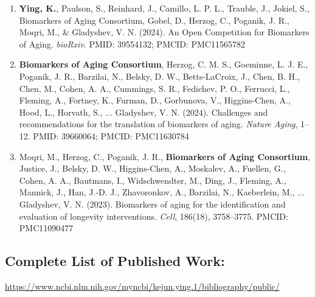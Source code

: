 \documentclass{nihbiosketch}
\begin{document}
\begin{enumerate}
\begin{enumerate}
\item \textbf{Ying, K.}, Paulson, S., Reinhard, J., Camillo, L. P. L., Trauble, J., Jokiel, S., Biomarkers of Aging Consortium, Gobel, D., Herzog, C., Poganik, J. R., Moqri, M., \& Gladyshev, V. N. (2024). An Open Competition for Biomarkers of Aging. \textit{bioRxiv}. PMID: 39554132; PMCID: PMC11565782

\item \textbf{Biomarkers of Aging Consortium}, Herzog, C. M. S., Goeminne, L. J. E., Poganik, J. R., Barzilai, N., Belsky, D. W., Betts-LaCroix, J., Chen, B. H., Chen, M., Cohen, A. A., Cummings, S. R., Fedichev, P. O., Ferrucci, L., Fleming, A., Fortney, K., Furman, D., Gorbunova, V., Higgins-Chen, A., Hood, L., Horvath, S., ... Gladyshev, V. N. (2024). Challenges and recommendations for the translation of biomarkers of aging. \textit{Nature Aging}, 1--12. PMID: 39660064; PMCID: PMC11630784

\item Moqri, M., Herzog, C., Poganik, J. R., \textbf{Biomarkers of Aging Consortium}, Justice, J., Belsky, D. W., Higgins-Chen, A., Moskalev, A., Fuellen, G., Cohen, A. A., Bautmans, I., Widschwendter, M., Ding, J., Fleming, A., Mannick, J., Han, J.-D. J., Zhavoronkov, A., Barzilai, N., Kaeberlein, M., ... Gladyshev, V. N. (2023). Biomarkers of aging for the identification and evaluation of longevity interventions. \textit{Cell}, 186(18), 3758--3775. PMCID: PMC11090477

\end{enumerate}

\end{enumerate}

\subsection*{Complete List of Published Work:} 
\url{https://www.ncbi.nlm.nih.gov/myncbi/kejun.ying.1/bibliography/public/}
\end{document}
